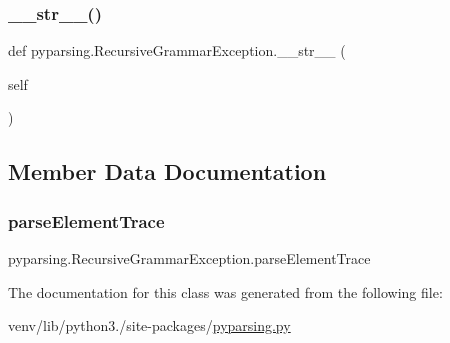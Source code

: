 \subsubsection{\texorpdfstring{\+\_\+\+\_\+str\+\_\+\+\_\+()}{\_\_str\_\_()}}
{\footnotesize\ttfamily def pyparsing.\+Recursive\+Grammar\+Exception.\+\_\+\+\_\+str\+\_\+\+\_\+ (\begin{DoxyParamCaption}\item[{}]{self }\end{DoxyParamCaption})}



\subsection{Member Data Documentation}
\mbox{\label{classpyparsing_1_1RecursiveGrammarException_a0bd6b62f17892552bac58a1413211d5f}} 
\subsubsection{\texorpdfstring{parse\+Element\+Trace}{parseElementTrace}}
{\footnotesize\ttfamily pyparsing.\+Recursive\+Grammar\+Exception.\+parse\+Element\+Trace}



The documentation for this class was generated from the following file\+:\begin{DoxyCompactItemize}
\item 
venv/lib/python3./site-\/packages/\hyperlink{pyparsing_8py}{pyparsing.\+py}\end{DoxyCompactItemize}
